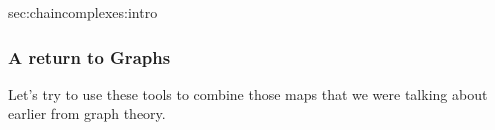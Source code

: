 \begin{stationconnection}{sec:chaincomplexes:intro}
\begin{comment}
S_2\arrow{r}{j_2} & S_1\cup S_2= C
\end{tikzcd}\]
\begin{theorem} Let $A=S_1\cap S_2$, $B=S_1\sqcup S_2$, and $C=S_1\cup S_2$. Then define the maps  \label{thm:inexcategory}
\begin{align*}
f:=i_1\oplus i_2&: \mathcal A\to \mathcal B\\
g:=j_1\oplus j_2&: \mathcal B\to \mathcal C. 
\end{align*}
Then $f$ is injective, $g$ is surjective, and $\ker g = \im f$ .
\end{theorem}
\begin{corollary}[Inclusion-Exclusion.]
$|A|-|B|+|C|=0$. 
\end{corollary}
\begin{proof}
We will instead show that $\dim\mathcal A- \dim\mathcal B + \dim \mathcal C=0$ with 2 applications of the rank-nullity theorem. 
\begin{align*}
\dim\mathcal A- \dim\mathcal B + \dim \mathcal C=& (\dim \ker(f) + \dim \im(f))\\&-(\dim \ker(f) + \dim \im(g))+\dim \mathcal C
\intertext{As the map $f$ is injective and $g$ is surjective}
=& (0 + \dim \im(f))\\&-(\dim \ker(f) + \dim \im(g))+\dim \im g)\\
=& \dim \im(f)-\dim \ker(f)\\
=&0.
\end{align*}
\end{proof}
\end{comment}

\end{stationconnection}
\subsubsection{A return to Graphs}
Let's try to use these tools to combine those maps that we were talking about earlier from graph theory. 

